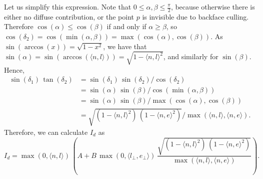\documentclass{article}
\theoremstyle{definition}
\theoremstyle{remark}
\begin{document}
Let us simplify this expression.
Note that $0 \leq \alpha, \beta \leq \frac{\pi}{2}$, because otherwise there is either no diffuse contribution, or the point $p$ is invisible due to backface culling.
Therefore $\cos(\alpha) \leq \cos(\beta)$ if and only if $\alpha \geq \beta$, so $\cos(\delta_2) = \cos(\min(\alpha, \beta)) = \max(\cos(\alpha), \cos(\beta))$.
As $\sin(\arccos(x)) = \sqrt{1 - x^2}$, we have that $\sin(\alpha) = \sin(\arccos(\langle n, l \rangle)) = \sqrt{1 - \langle n, l \rangle^2}$, and similarly for $\sin(\beta)$.
Hence,
\begin{align*}
\sin(\delta_1) \, \tan(\delta_2)
 & = \sin(\delta_1) \, \sin(\delta_2) / \cos(\delta_2) \\
 & = \sin(\alpha) \, \sin(\beta) / \cos(\min(\alpha, \beta)) \\
 & = \sin(\alpha) \, \sin(\beta) / \max(\cos(\alpha), \cos(\beta)) \\
 & = \sqrt{(1 - \langle n, l \rangle^2) \, (1 - \langle n, e \rangle^2)} / \max(\langle n, l \rangle, \langle n, e \rangle).
\end{align*}
Therefore, we can calculate $I_d$ as
\begin{equation}
I_d = \max(0, \langle n, l \rangle) \, \left( A + B \, \max(0, \langle l_\perp, e_\perp \rangle) \, \frac{\sqrt{(1 - \langle n, l \rangle^2) \, (1 - \langle n, e \rangle^2)}}{\max(\langle n, l \rangle, \langle n, e \rangle)} \right).
\end{equation}



\end{document}
